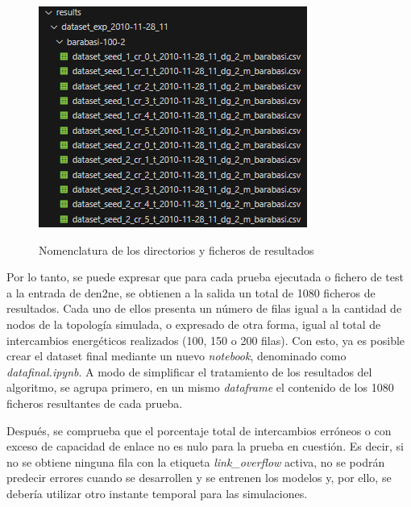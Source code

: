 \begin{figure}[h!]
\begin{minipage}{0.6\textwidth}
      \includegraphics[width=\linewidth]{img/diseno/dirpruebas.png}
      \label{fig:dirpruebas}
    \end{minipage}\hfill
    \caption{Nomenclatura de los directorios y ficheros de resultados}
    \label{fig:dirnombres}
\end{figure}

\vspace{3mm}

Por lo tanto, se puede expresar que para cada prueba ejecutada o fichero de test a la entrada de \gls{den2ne}, se obtienen a la salida un total de 1080 ficheros de resultados. Cada uno de ellos presenta un número de filas igual a la cantidad de nodos de la topología simulada, o expresado de otra forma, igual al total de intercambios energéticos realizados (100, 150 o 200 filas). Con esto, ya es posible crear el dataset final mediante un nuevo \textit{notebook}, denominado como \textit{datafinal.ipynb}. A modo de simplificar el tratamiento de los resultados del algoritmo, se agrupa primero, en un mismo \textit{dataframe} el contenido de los 1080 ficheros resultantes de cada prueba. 

\vspace{3mm}

Después, se comprueba que el porcentaje total de intercambios erróneos o con exceso de capacidad de enlace no es nulo para la prueba en cuestión. Es decir, si no se obtiene ninguna fila con la etiqueta \textit{link\_overflow} activa, no se podrán predecir errores cuando se desarrollen y se entrenen los modelos y, por ello, se debería utilizar otro instante temporal para las simulaciones. 

